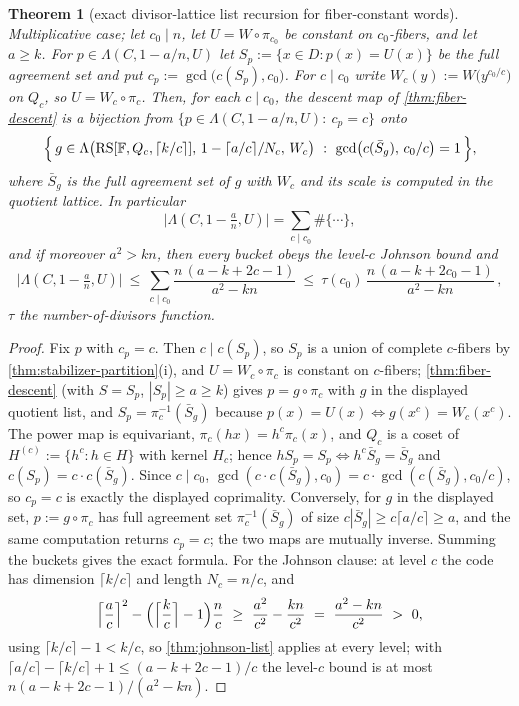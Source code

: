 \documentclass[11pt]{article}
\newtheorem{theorem}{Theorem}[section]
\theoremstyle{definition}
\theoremstyle{remark}
\newcommand{\F}{\mathbb{F}}
\newcommand{\RS}{\mathrm{RS}}
\newcommand{\Lst}{\Lambda}
\begin{document}
\begin{theorem}[exact divisor-lattice list recursion for fiber-constant words]\label{thm:list-recursion}
Multiplicative case; let $c_0\mid n$, let $U=W\circ\pi_{c_0}$ be constant on $c_0$-fibers, and let $a\ge k$. For $p\in\Lst(C,1-a/n,U)$ let $S_p:=\{x\in D:p(x)=U(x)\}$ be the full agreement set and put $c_p:=\gcd\bigl(c(S_p),c_0\bigr)$. For $c\mid c_0$ write $W_c(y):=W\bigl(y^{c_0/c}\bigr)$ on $Q_c$, so $U=W_c\circ\pi_c$. Then, for each $c\mid c_0$, the descent map of \cref{thm:fiber-descent} is a bijection from $\{p\in\Lst(C,1-a/n,U):\ c_p=c\}$ onto
\[
\Bigl\{\,g\in\Lst\bigl(\RS[\F,Q_c,\lceil k/c\rceil],\,1-\lceil a/c\rceil/N_c,\,W_c\bigr)\ :\ \gcd\bigl(c(\bar S_g),\,c_0/c\bigr)=1\,\Bigr\},
\]
where $\bar S_g$ is the full agreement set of $g$ with $W_c$ and its scale is computed in the quotient lattice. In particular
\[
\bigl|\Lst(C,1-\tfrac an,U)\bigr|=\sum_{c\mid c_0}\#\{\cdots\},
\]
and if moreover $a^2>kn$, then every bucket obeys the level-$c$ Johnson bound and
\[
\bigl|\Lst(C,1-\tfrac an,U)\bigr|\ \le\ \sum_{c\mid c_0}\frac{n\,(a-k+2c-1)}{a^2-kn}\ \le\ \tau(c_0)\,\frac{n\,(a-k+2c_0-1)}{a^2-kn}\,,
\]
$\tau$ the number-of-divisors function.
\end{theorem}

\begin{proof}
Fix $p$ with $c_p=c$. Then $c\mid c(S_p)$, so $S_p$ is a union of complete $c$-fibers by \cref{thm:stabilizer-partition}(i), and $U=W_c\circ\pi_c$ is constant on $c$-fibers; \cref{thm:fiber-descent} (with $S=S_p$, $|S_p|\ge a\ge k$) gives $p=g\circ\pi_c$ with $g$ in the displayed quotient list, and $S_p=\pi_c^{-1}(\bar S_g)$ because $p(x)=U(x)\iff g(x^c)=W_c(x^c)$. The power map is equivariant, $\pi_c(hx)=h^c\pi_c(x)$, and $Q_c$ is a coset of $H^{(c)}:=\{h^c:h\in H\}$ with kernel $H_c$; hence $hS_p=S_p\iff h^c\bar S_g=\bar S_g$ and $c(S_p)=c\cdot c(\bar S_g)$. Since $c\mid c_0$, $\gcd(c\cdot c(\bar S_g),c_0)=c\cdot\gcd(c(\bar S_g),c_0/c)$, so $c_p=c$ is exactly the displayed coprimality. Conversely, for $g$ in the displayed set, $p:=g\circ\pi_c$ has full agreement set $\pi_c^{-1}(\bar S_g)$ of size $c|\bar S_g|\ge c\lceil a/c\rceil\ge a$, and the same computation returns $c_p=c$; the two maps are mutually inverse. Summing the buckets gives the exact formula. For the Johnson clause: at level $c$ the code has dimension $\lceil k/c\rceil$ and length $N_c=n/c$, and
\[
\Bigl\lceil\frac ac\Bigr\rceil^2-\Bigl(\Bigl\lceil\frac kc\Bigr\rceil-1\Bigr)\frac nc\ \ge\ \frac{a^2}{c^2}-\frac{kn}{c^2}\ =\ \frac{a^2-kn}{c^2}\ >\ 0,
\]
using $\lceil k/c\rceil-1<k/c$, so \cref{thm:johnson-list} applies at every level; with $\lceil a/c\rceil-\lceil k/c\rceil+1\le(a-k+2c-1)/c$ the level-$c$ bound is at most $n(a-k+2c-1)/(a^2-kn)$.
\end{proof}
\end{document}
